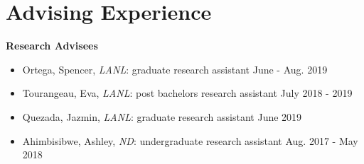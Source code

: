 \documentclass[11pt, letterpaper, roman]{moderncv} %
\begin{document}
\vspace{4pt}

\section{Advising Experience}

\textbf{Research Advisees}

\small
    \begin{itemize}
        \item Ortega, Spencer, \textit{LANL}: graduate research assistant \hfill June - Aug. 2019
        \item Tourangeau, Eva, \textit{LANL}: post bachelors research assistant \hfill July 2018 - 2019
        \item Quezada, Jazmin, \textit{LANL}: graduate research assistant \hfill June 2019
        \item Ahimbisibwe, Ashley, \textit{ND}: undergraduate research assistant \hfill Aug. 2017 - May 2018
    \end{itemize}
\normalsize
\end{document}
